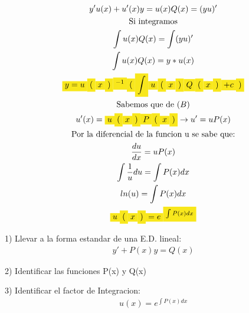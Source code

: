 \documentclass{article}
\begin{document}
\begin{gather*}
y'u(x)+u'(x)y = u(x)Q(x) =(yu)'   \\
\text{Si integramos} \\
\int u(x)Q(x) =\int (yu)'   \\
\int u(x)Q(x)=y*u(x) \\
\text{\colorbox[RGB]{248,231,28}{$y = u$}}\text{\colorbox[RGB]{248,231,28}{$($}}\text{\colorbox[RGB]{248,231,28}{$x$}}\text{\colorbox[RGB]{248,231,28}{$)$}}\text{\colorbox[RGB]{248,231,28}{$^{-1}$}}\text{\colorbox[RGB]{248,231,28}{$($}}\text{\colorbox[RGB]{248,231,28}{$\int $}}\text{\colorbox[RGB]{248,231,28}{$u$}}\text{\colorbox[RGB]{248,231,28}{$($}}\text{\colorbox[RGB]{248,231,28}{$x$}}\text{\colorbox[RGB]{248,231,28}{$)$}}\text{\colorbox[RGB]{248,231,28}{$Q$}}\text{\colorbox[RGB]{248,231,28}{$($}}\text{\colorbox[RGB]{248,231,28}{$x$}}\text{\colorbox[RGB]{248,231,28}{$)$}}\text{\colorbox[RGB]{248,231,28}{$+c$}}\text{\colorbox[RGB]{248,231,28}{$)$}} \\
\text{Sabemos que de }(B) \\
u'(x) = \text{\colorbox[RGB]{248,231,28}{$u$}}\text{\colorbox[RGB]{248,231,28}{$($}}\text{\colorbox[RGB]{248,231,28}{$x$}}\text{\colorbox[RGB]{248,231,28}{$)$}}\text{\colorbox[RGB]{248,231,28}{$P$}}\text{\colorbox[RGB]{248,231,28}{$($}}\text{\colorbox[RGB]{248,231,28}{$x$}}\text{\colorbox[RGB]{248,231,28}{$)$}}   \rightarrow   u'=uP(x) \\
\text{Por la diferencial de la funcion u se sabe que:} \\
\frac{du}{dx}=uP(x) \\
\int \frac{1}{u}du=\int P(x)dx \\
ln(u) = \int P(x)dx \\
\text{\colorbox[RGB]{248,231,28}{$u$}}\text{\colorbox[RGB]{248,231,28}{$($}}\text{\colorbox[RGB]{248,231,28}{$x$}}\text{\colorbox[RGB]{248,231,28}{$)$}}\text{\colorbox[RGB]{248,231,28}{$ = e$}}\text{\colorbox[RGB]{248,231,28}{$^{\int P(x)dx}$}}
\end{gather*}






1) Llevar a la forma estandar de una E.D. lineal: 
\begin{gather*}
y'+P(x)y=Q(x)
\end{gather*}


2) Identificar las funciones P(x) y Q(x)

3) Identificar el factor de Integracion: 
\begin{gather*}
u(x) = e^{\int P(x)dx}
\end{gather*}
\end{document}

